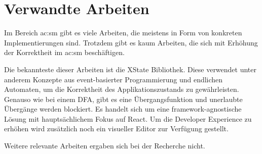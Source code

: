 \chapter{Verwandte Arbeiten}

Im Bereich \acrlong{ac:sm} gibt es viele Arbeiten, die meistens in Form von konkreten Implementierungen sind. Trotzdem gibt es kaum Arbeiten, die sich mit Erhöhung der Korrektheit im \acrshort{ac:sm} beschäftigen.

Die bekannteste dieser Arbeiten ist die XState Bibliothek. Diese verwendet unter anderem Konzepte aus event-basierter Programmierung und endlichen Automaten, um die Korrektheit des Applikationszustands zu gewährleisten. Genauso wie bei einem DFA, gibt es eine Übergangsfunktion und unerlaubte Übergänge werden blockiert. Es handelt sich um eine framework-agnostische Lösung mit hauptsächlichem Fokus auf React. Um die Developer Experience zu erhöhen wird zusätzlich noch ein visueller Editor zur Verfügung gestellt.\cite{xstate}

Weitere relevante Arbeiten ergaben sich bei der Recherche nicht.